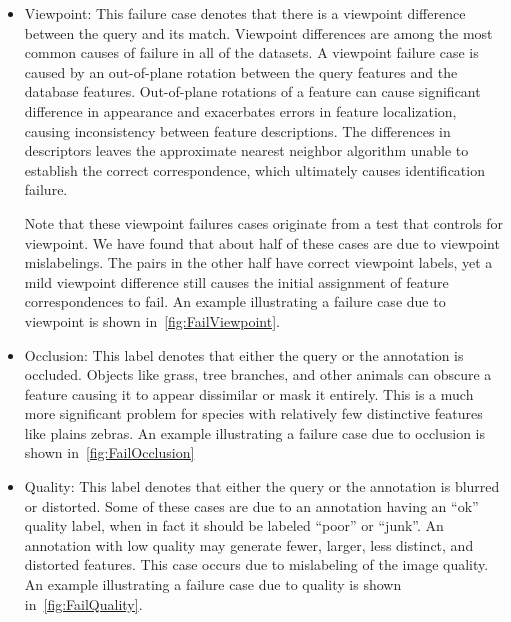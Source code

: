        \begin{itemize}

            \item Viewpoint:
            This failure case denotes that there is a viewpoint
              difference between the query and its \groundtrue{} match.
            Viewpoint differences are among the most common causes of
              failure in all of the datasets.
            A viewpoint failure case is caused by an out-of-plane
              rotation between the query features and the \groundtrue{}
              database features.
            Out-of-plane rotations of a feature can cause significant
              difference in appearance and exacerbates errors in feature
              localization, causing inconsistency between feature
              descriptions.
            The differences in descriptors leaves the approximate
              nearest neighbor algorithm unable to establish the correct
              correspondence, which ultimately causes identification
              failure.

            Note that these viewpoint failures cases originate from a
              test that controls for viewpoint.
            We have found that about half of these cases are due to
              viewpoint mislabelings.
            The pairs in the other half have correct viewpoint labels,
              yet a mild viewpoint difference still causes the initial
              assignment of feature correspondences to fail.
            An example illustrating a failure case due to viewpoint is
              shown in~\cref{fig:FailViewpoint}.

            \FailViewpoint{}

            \item Occlusion:
            This label denotes that either the query or the \groundtrue{}
              annotation is occluded.
            Objects like grass, tree branches, and other animals can
              obscure a feature causing it to appear dissimilar or mask
              it entirely.
            This is a much more significant problem for species with
              relatively few distinctive features like plains zebras.
            An example illustrating a failure case due to occlusion is
              shown in~\cref{fig:FailOcclusion}

                \FailOcclusion{}

            \item Quality:
            This label denotes that either the query or the
              \groundtrue{} annotation is blurred or distorted.
            Some of these cases are due to an annotation having an
              ``ok'' quality label, when in fact it should be labeled
              ``poor'' or ``junk''.
            An annotation with low quality may generate fewer, larger,
              less distinct, and distorted features.
            This case occurs due to mislabeling of the image quality.
            An example illustrating a failure case due to quality is
              shown in~\cref{fig:FailQuality}.


\end{itemize}

